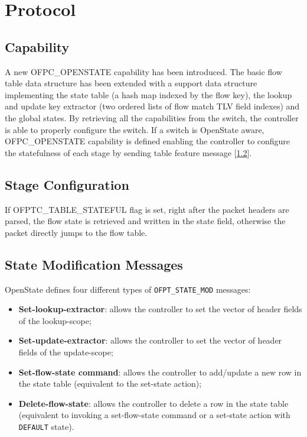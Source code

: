 
\chapter{Protocol}
\label{chap:protocol}

\section{Capability}
\label{sec:capability}
A new OFPC\_OPENSTATE capability has been introduced.
The basic flow table data structure has been extended with a support data structure implementing the state table (a hash map indexed by the flow key), the lookup and update key extractor (two ordered lists of flow match TLV field indexes) and the global states.
By retrieving all the capabilities from the switch, the controller is able to properly configure the switch. If a switch is OpenState aware, OFPC\_OPENSTATE capability is defined enabling the controller to configure the statefulness of each stage by sending table feature message [\ref{sec:table_conf}].

\section{Stage Configuration}
\label{sec:table_conf}
If OFPTC\_TABLE\_STATEFUL flag is set, right after the packet headers are parsed, the flow state is retrieved and written in the state field, otherwise the packet directly jumps to the flow table. 

\section{State Modification Messages}

\label{sec:msg_set_state}

OpenState defines four different types of \texttt{OFPT\_STATE\_MOD} messages: 
\begin{itemize}
\setlength\itemsep{0em}
\item \textbf{Set-lookup-extractor}: allows the controller to set the vector of header fields of the lookup-scope;
\item \textbf{Set-update-extractor}: allows the controller to set the vector of header fields of the update-scope;
\item \textbf{Set-flow-state command}: allows the controller to add/update a new row in the state table (equivalent to the set-state action);
\item \textbf{Delete-flow-state}: allows the controller to delete a row in the state table (equivalent to invoking a  set-flow-state command or a set-state action with \texttt{DEFAULT} state).
\end{itemize}

